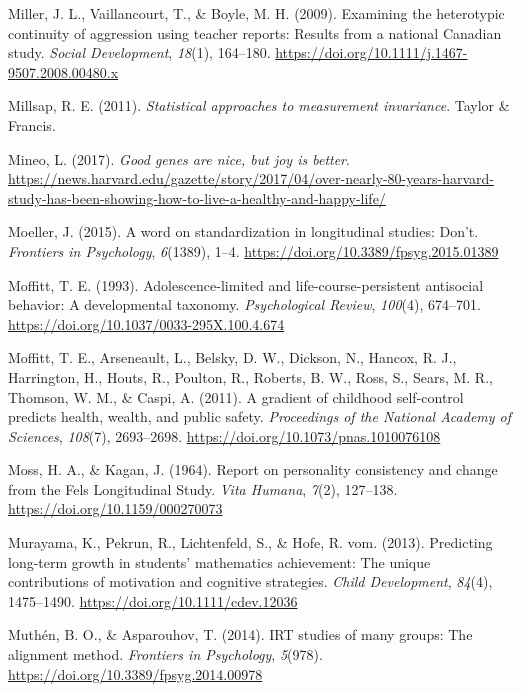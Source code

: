 \documentclass[
  american,
  letterpaper,
  12pt]{article}
\newlength{\cslhangindent}
\newenvironment{CSLReferences}[2] %
 {\begin{list}{}{%
  \setlength{\itemindent}{0pt}
  \setlength{\leftmargin}{0pt}
  \setlength{\parsep}{0pt}
  \ifodd #1
   \setlength{\leftmargin}{\cslhangindent}
   \setlength{\itemindent}{-1\cslhangindent}
  \fi
  \setlength{\itemsep}{#2\baselineskip}}}
 {\end{list}}
\begin{document}
\begin{CSLReferences}{1}{0}
Miller, J. L., Vaillancourt, T., \& Boyle, M. H. (2009). Examining the
heterotypic continuity of aggression using teacher reports: {Results}
from a national {Canadian} study. \emph{Social Development},
\emph{18}(1), 164--180.
\url{https://doi.org/10.1111/j.1467-9507.2008.00480.x}

Millsap, R. E. (2011). \emph{Statistical approaches to measurement
invariance}. Taylor \& Francis.

Mineo, L. (2017). \emph{Good genes are nice, but joy is better}.
\url{https://news.harvard.edu/gazette/story/2017/04/over-nearly-80-years-harvard-study-has-been-showing-how-to-live-a-healthy-and-happy-life/}

Moeller, J. (2015). A word on standardization in longitudinal studies:
{Don't}. \emph{Frontiers in Psychology}, \emph{6}(1389), 1--4.
\url{https://doi.org/10.3389/fpsyg.2015.01389}

Moffitt, T. E. (1993). Adolescence-limited and life-course-persistent
antisocial behavior: {A} developmental taxonomy. \emph{Psychological
Review}, \emph{100}(4), 674--701.
\url{https://doi.org/10.1037/0033-295X.100.4.674}

Moffitt, T. E., Arseneault, L., Belsky, D. W., Dickson, N., Hancox, R.
J., Harrington, H., Houts, R., Poulton, R., Roberts, B. W., Ross, S.,
Sears, M. R., Thomson, W. M., \& Caspi, A. (2011). A gradient of
childhood self-control predicts health, wealth, and public safety.
\emph{Proceedings of the National Academy of Sciences}, \emph{108}(7),
2693--2698. \url{https://doi.org/10.1073/pnas.1010076108}

Moss, H. A., \& Kagan, J. (1964). Report on personality consistency and
change from the {Fels Longitudinal Study}. \emph{Vita Humana},
\emph{7}(2), 127--138. \url{https://doi.org/10.1159/000270073}

Murayama, K., Pekrun, R., Lichtenfeld, S., \& Hofe, R. vom. (2013).
Predicting long-term growth in students' mathematics achievement: {The}
unique contributions of motivation and cognitive strategies. \emph{Child
Development}, \emph{84}(4), 1475--1490.
\url{https://doi.org/10.1111/cdev.12036}

Muthén, B. O., \& Asparouhov, T. (2014). {IRT} studies of many groups:
The alignment method. \emph{Frontiers in Psychology}, \emph{5}(978).
\url{https://doi.org/10.3389/fpsyg.2014.00978}


\end{CSLReferences}
\end{document}
